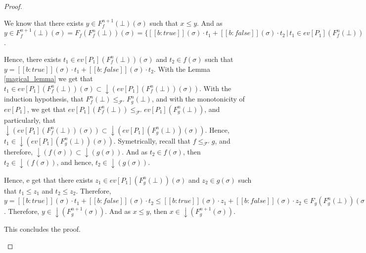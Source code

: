 \documentclass[a4paper,10pt]{llncs}
\begin{document}
\begin{proof}
\begin{itemize}
\begin{itemize}
We know that there exists $y \in F_f^{n+1}(\bot)(\sigma)$ such that $x \leq y$. And as $y \in F_f^{n+1}(\bot)(\sigma) = F_f(F_f^n(\bot))(\sigma) = \{[\![b : true ]\!](\sigma)\cdot t_1 + [\![b : false ]\!](\sigma)\cdot t_2 \,|\, t_1 \in ev[P_1](F_f^n(\bot))(\sigma), t_2 \in f(\sigma) \}$. \bigskip

Hence, there exists $t_1 \in ev[P_1](F_f^n(\bot))(\sigma)$ and $t_2 \in f(\sigma)$ such that $y = [\![b : true ]\!](\sigma)\cdot t_1 + [\![b : false ]\!](\sigma)\cdot t_2 $.\newline
With the Lemma \ref{magical_lemma} we get that $t_1 \in ev[P_1](F_f^n(\bot))(\sigma) \subset \downarrow(ev[P_1](F_f^n(\bot))(\sigma))$.\newline
With the induction hypothesis, that $F_f^n(\bot) \leq_{\mathcal{F}'} F_g^n(\bot)$, and with the monotonicity of $ev[P_1]$, we get that $ev[P_1](F_f^n(\bot)) \leq_{\mathcal{F}'} ev[P_1](F_g^n(\bot))$, and particularly, that $\downarrow(ev[P_1](F_f^n(\bot))(\sigma)) \subset \downarrow(ev[P_1](F_g^n(\bot))(\sigma))$. Hence, $t_1 \in \downarrow(ev[P_1](F_g^n(\bot))(\sigma))$.\newline
Symetrically, recall that $f \leq_{\mathcal{F}'} g$, and therefore, $\downarrow(f(\sigma)) \subset \downarrow(g(\sigma))$. And as $t_2 \in f(\sigma)$, then $t_2 \in \downarrow(f(\sigma))$, and hence, $t_2 \in \downarrow(g(\sigma))$.\bigskip

Hence, e get that there exists $z_1 \in ev[P_1](F_g^n(\bot))(\sigma)$ and $z_2 \in g(\sigma)$ such that $t_1 \leq z_1$ and $t_2 \leq z_2$.\newline
Therefore, $y = [\![b : true ]\!](\sigma)\cdot t_1 + [\![b : false ]\!](\sigma)\cdot t_2 \leq [\![b : true ]\!](\sigma)\cdot z_1 + [\![b : false ]\!](\sigma)\cdot z_2 \in F_g(F_g^n(\bot))(\sigma) = F_g^{n+1}(\sigma)$. Therefore, $y \in \downarrow(F_g^{n+1}(\sigma))$. And as $x \leq y$, then $x \in \downarrow(F_g^{n+1}(\sigma))$.\bigskip

This concludes the proof.
\end{itemize}
\end{itemize} 


\end{proof}
\end{document}
